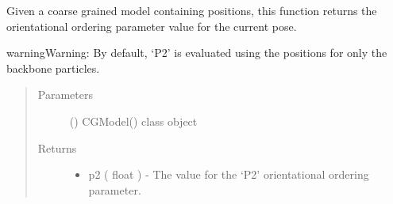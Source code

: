 \documentclass[letterpaper,12pt,english,openany,oneside]{sphinxmanual}
\begin{document}
\label{\detokenize{parameters:module-parameters.secondary_structure}}

\begin{fulllineitems}
\label{\detokenize{parameters:parameters.secondary_structure.calculate_p2}}
Given a coarse grained model containing positions, this function returns the  orientational ordering parameter value for the current pose.

\begin{sphinxadmonition}{warning}{Warning:}
By default, ‘P2’ is evaluated using the positions for only the backbone particles.
\end{sphinxadmonition}
\begin{quote}\begin{description}
\item[{Parameters}] \leavevmode
{} () \textendash{} CGModel() class object

\item[{Returns}] \leavevmode
\begin{itemize}
\item {} 
p2 ( float ) - The value for the ‘P2’ orientational ordering parameter.

\end{itemize}


\end{description}\end{quote}

\end{fulllineitems}

\end{document}

